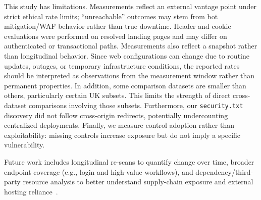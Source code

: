 \documentclass[conference]{IEEEtran}
\begin{document}
This study has limitations. Measurements reflect an external vantage point under strict ethical rate limits; ``unreachable'' outcomes may stem from
 bot mitigation/WAF behavior rather than true downtime. Header and cookie evaluations were performed
  on resolved landing pages and may differ on authenticated or transactional paths. 
  Measurements also reflect a snapshot rather than longitudinal behavior. 
  Since web configurations can change due to routine updates, outages, or temporary infrastructure conditions, the reported rates
   should be interpreted as observations from the measurement window rather than permanent properties. 
   In addition, some comparison datasets are smaller than others, particularly certain UK subsets. 
   This limits the strength of direct cross-dataset comparisons involving those subsets.
  Furthermore, our \texttt{security.txt} discovery did not follow cross-origin redirects, potentially undercounting
   centralized deployments. Finally, we measure control adoption rather than exploitability: missing controls
    increase exposure but do not imply a specific vulnerability.

Future work includes longitudinal re-scans to quantify change over time, broader endpoint coverage (e.g., login and high-value workflows), and dependency/third-party resource analysis to better understand supply-chain exposure and external hosting reliance~\cite{hsiao2019cyberautonomy}.



\end{document}

